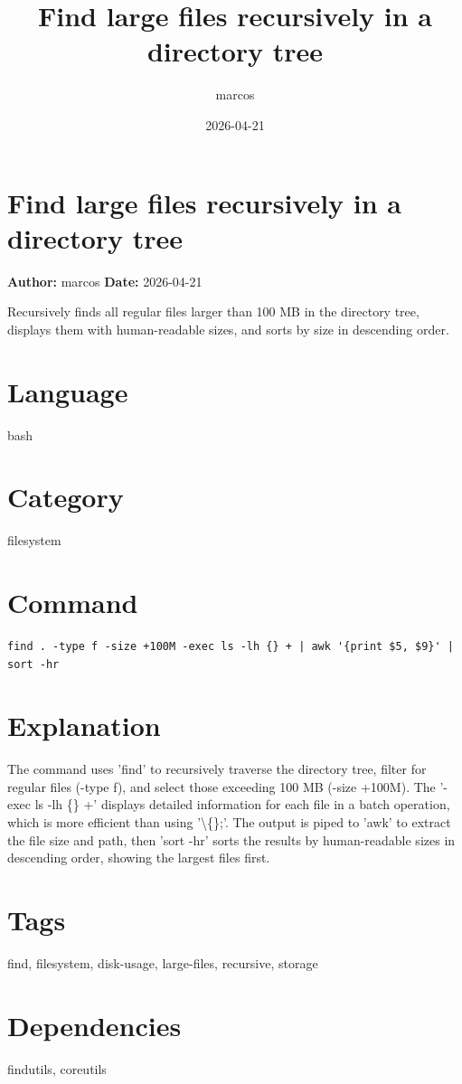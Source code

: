 \documentclass{article}
\title{Find large files recursively in a directory tree}
\author{marcos}
\date{2026-04-21}
\begin{document}
\section*{Find large files recursively in a directory tree}
\textbf{Author:} marcos \hfill \textbf{Date:} 2026-04-21

\noindent Recursively finds all regular files larger than 100 MB in the directory tree, displays them with human-readable sizes, and sorts by size in descending order.

\section*{Language}
bash

\section*{Category}
filesystem

\section*{Command}
\begin{lstlisting}
find . -type f -size +100M -exec ls -lh {} + | awk '{print $5, $9}' | sort -hr
\end{lstlisting}

\section*{Explanation}
The command uses 'find' to recursively traverse the directory tree, filter for regular files (-type f), and select those exceeding 100 MB (-size +100M). The '-exec ls -lh \{\} +' displays detailed information for each file in a batch operation, which is more efficient than using '\textbackslash\{\};'. The output is piped to 'awk' to extract the file size and path, then 'sort -hr' sorts the results by human-readable sizes in descending order, showing the largest files first.

\section*{Tags}
find, filesystem, disk-usage, large-files, recursive, storage

\section*{Dependencies}
findutils, coreutils
\end{document}
